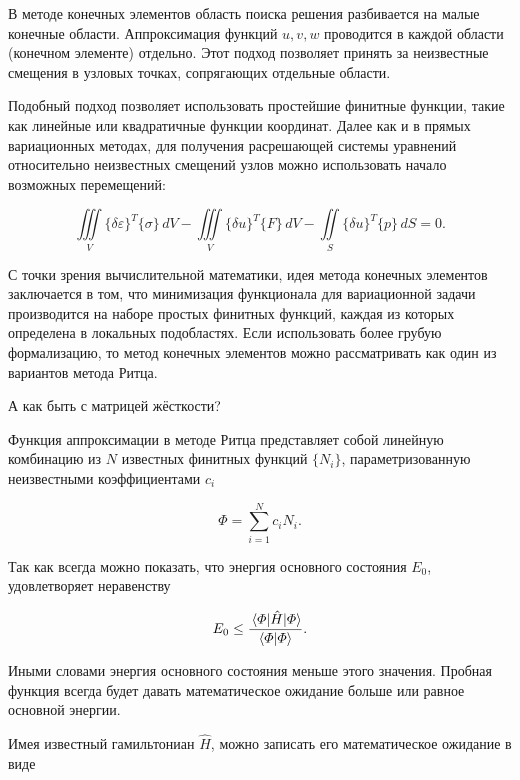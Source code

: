 \documentclass{article}
\begin{document}
В методе конечных элементов область поиска решения разбивается на малые конечные области. Аппроксимация функций $u, v, w$ проводится в каждой области (конечном элементе) отдельно. Этот подход позволяет принять за неизвестные смещения в узловых точках, сопрягающих отдельные области.

Подобный подход позволяет использовать простейшие финитные функции, такие как линейные или квадратичные функции координат. Далее как и в прямых вариационных методах, для получения расрешающей системы уравнений относительно неизвестных смещений узлов можно использовать начало возможных перемещений:

\begin{displaymath}
	\iiint\limits_V \{ \delta \varepsilon \}^{T} \{\sigma\} \,dV - \iiint\limits_V \{ \delta u \}^{T} \{ F \} \,dV - \iint\limits_S \{ \delta u \}^{T} \{ p \} \,dS = 0.
\end{displaymath}

С точки зрения вычислительной математики, идея метода конечных элементов заключается в том, что минимизация функционала для вариационной задачи производится на наборе простых финитных функций, каждая из которых определена в локальных подобластях. Если использовать более грубую формализацию, то метод конечных элементов можно рассматривать как один из вариантов метода Ритца.

\newpage
\begin{question}
	А как быть с матрицей жёсткости?
\end{question}

Функция аппроксимации в методе Ритца представляет собой линейную комбинацию из $N$ известных финитных функций $\{ N_{i} \}$, параметризованную неизвестными коэффициентами $c_{i}$

\begin{displaymath}
	\varPhi = \sum_{i=1}^{N} c_{i} N_{i}.
\end{displaymath}

Так как всегда можно показать, что энергия основного состояния $E_{0}$, удовлетворяет неравенству

\begin{displaymath}
	E_{0} \leq \frac{\expval{\hat{H}}{\varPhi}}{\bra{\varPhi} \ket{\varPhi}}.
\end{displaymath}

Иными словами энергия основного состояния меньше этого значения. Пробная функция всегда будет давать математическое ожидание больше или равное основной энергии.

Имея известный гамильтониан $\hat{H}$, можно записать его математическое ожидание в виде
\end{document}
